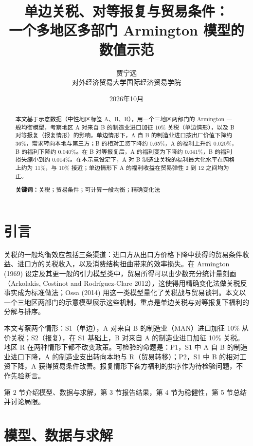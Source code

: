 \documentclass[11pt,a4paper]{ctexart}
\title{单边关税、对等报复与贸易条件：\\一个多地区多部门 Armington 模型的数值示范}
\author{贾宁远\\对外经济贸易大学国际经济贸易学院}
\date{2026年10月}
\begin{document}
\maketitle

\begin{center}
\end{center}

\begin{abstract}
本文基于示意数据（中性地区标签 A、B、R），用一个三地区两部门的 Armington 一般均衡模型，考察地区 A 对来自 B 的制造业进口加征 10\% 关税（单边情形），以及 B 对等报复（报复情形）的影响。单边情形下，A 自 B 的制造业进口按出厂价值下降约 36\%，需求转向本地与第三方；B 的相对工资下降约 0.65\%，A 的福利上升约 0.020\%，B 的福利下降约 0.040\%。在 B 对等报复后，A 的福利变为下降约 0.041\%，B 的福利损失缩小到约 0.014\%。在本示意设定下，A 对 B 制造业关税的福利最大化水平在网格上约为 11\%，与 10\% 接近；单边情形下 A 的福利收益在贸易弹性 2 到 12 之间均为正。

\noindent\textbf{关键词：}关税；贸易条件；可计算一般均衡；精确变化法
\end{abstract}

\section{引言}

关税的一般均衡效应包括三条渠道：进口方从出口方价格下降中获得的贸易条件收益、进口方的关税收入，以及消费结构扭曲带来的效率损失。在 Armington (1969) 设定及其更一般的引力模型类中，贸易所得可以由少数充分统计量刻画（Arkolakis, Costinot and Rodríguez-Clare 2012），这使得用精确变化法做关税反事实成为标准做法；Ossa (2014) 用这一类模型量化了关税战与贸易谈判。本文以一个三地区两部门的示意模型展示这些机制，重点是单边关税与对等报复下福利的分解与排序。

本文考察两个情形：S1（单边），A 对来自 B 的制造业（MAN）进口加征 10\% 从价关税；S2（报复），在 S1 基础上，B 对来自 A 的制造业进口加征 10\% 关税。地区 R 在两种情形下都不改变政策。可检验的命题是：P1，S1 中 A 自 B 的制造业进口下降，A 的制造业支出转向本地与 R（贸易转移）；P2，S1 中 B 的相对工资下降，A 获得贸易条件改善。报复情形下各方福利的排序作为待检验问题，不作先验断言。

第 2 节介绍模型、数据与求解，第 3 节报告结果，第 4 节为稳健性，第 5 节总结并讨论局限。

\section{模型、数据与求解}
\end{document}
